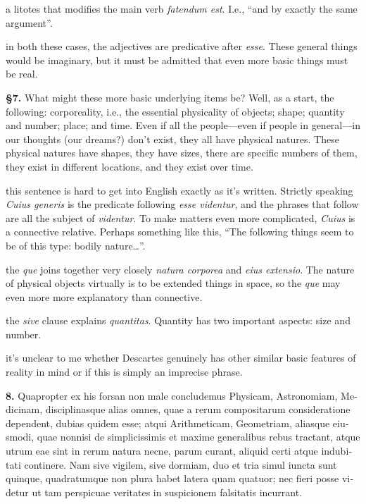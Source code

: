  a litotes that modifies the main verb \textit{fatendum est}. I.e., ``and by exactly the same argument''.

 in both these cases, the adjectives are predicative after \textit{esse}. These general things would be imaginary, but it must be admitted that even more basic things must be real.

\textbf{§7.} What might these more basic underlying items be? Well, as a start, the following: corporeality, i.e., the essential physicality of objects; shape; quantity and number; place; and time. Even if all the people---even if people in general---in our thoughts (our dreams?) don't exist, they all have physical natures. These physical natures have shapes, they have sizes, there are specific numbers of them, they exist in different locations, and they exist over time.

 this sentence is hard to get into English exactly as it's written. Strictly speaking \textit{Cuius generis} is the predicate following \textit{esse videntur}, and the phrases that follow are all the subject of \textit{videntur}. To make matters even more complicated, \textit{Cuius} is a connective relative. Perhaps something like this, ``The following things seem to be of this type: bodily nature\dots''.

 the \textit{que} joins together very closely \textit{natura corporea} and \textit{eius extensio}. The nature of physical objects virtually is to be extended things in space, so the \textit{que} may even more more explanatory than connective.

 the \textit{sive} clause explains \textit{quantitas}. Quantity has two important aspects: size and number.

 it's unclear to me whether Descartes genuinely has other similar basic features of reality in mind or if this is simply an imprecise phrase.

\clearpage

\beginnumbering
\pstart
\begin{latin}
    \textenglish{\textbf{8.}} Quapropter ex his forsan non male concludemus Physicam, Astronomiam, Medicinam, disciplinasque alias omnes, quae a rerum compositarum consideratione dependent, dubias quidem esse; atqui Arithmeticam, Geometriam, aliasque eiusmodi, quae nonnisi de simplicissimis et maxime generalibus rebus tractant, atque utrum eae sint in rerum natura necne, parum curant, aliquid certi atque indubitati continere. Nam sive vigilem, sive dormiam, duo et tria simul iuncta sunt quinque, quadratumque non plura habet latera quam quatuor; nec fieri posse videtur ut tam perspicuae veritates in suspicionem falsitatis incurrant.
\end{latin}
\pend
\endnumbering

